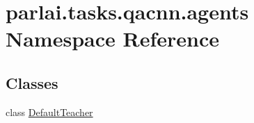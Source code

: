 \hypertarget{namespaceparlai_1_1tasks_1_1qacnn_1_1agents}{}\section{parlai.\+tasks.\+qacnn.\+agents Namespace Reference}
\label{namespaceparlai_1_1tasks_1_1qacnn_1_1agents}
\subsection*{Classes}
\begin{DoxyCompactItemize}
\item 
class \hyperlink{classparlai_1_1tasks_1_1qacnn_1_1agents_1_1DefaultTeacher}{Default\+Teacher}
\end{DoxyCompactItemize}
